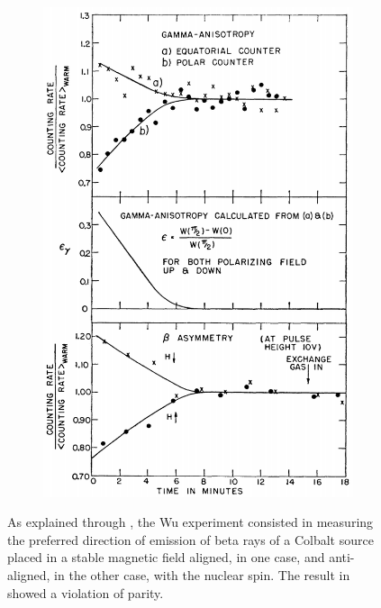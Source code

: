 \begin{figure}[H]
\begin{subfigure}{0.5\linewidth}
			\includegraphics[width=0.5\plotwidth]{fig/chapt2/Wu_result.png}
			\caption{\label{fig:parity-violation:B}}
		\end{subfigure}
		\caption{\label{fig:parity-violation} As explained through , the Wu experiment consisted in measuring the preferred direction of emission of beta rays of a Colbalt source placed in a stable magnetic field aligned, in one case, and anti-aligned, in the other case, with the nuclear spin. The result in  showed a violation of parity.}
	\end{figure}
	
